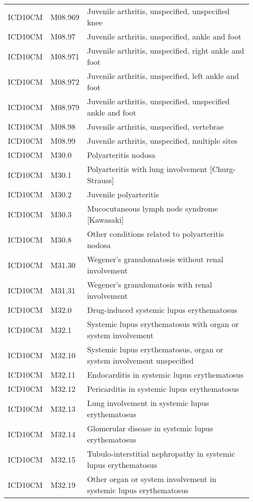 \begin{table}[ht]
\begin{tabular}{lll}
  ICD10CM & M08.969 & Juvenile arthritis, unspecified, unspecified knee \\ 
  ICD10CM & M08.97 & Juvenile arthritis, unspecified, ankle and foot \\ 
  ICD10CM & M08.971 & Juvenile arthritis, unspecified, right ankle and foot \\ 
  ICD10CM & M08.972 & Juvenile arthritis, unspecified, left ankle and foot \\ 
  ICD10CM & M08.979 & Juvenile arthritis, unspecified, unspecified ankle and foot \\ 
  ICD10CM & M08.98 & Juvenile arthritis, unspecified, vertebrae \\ 
  ICD10CM & M08.99 & Juvenile arthritis, unspecified, multiple sites \\ 
  ICD10CM & M30.0 & Polyarteritis nodosa \\ 
  ICD10CM & M30.1 & Polyarteritis with lung involvement [Churg-Strauss] \\ 
  ICD10CM & M30.2 & Juvenile polyarteritis \\ 
  ICD10CM & M30.3 & Mucocutaneous lymph node syndrome [Kawasaki] \\ 
  ICD10CM & M30.8 & Other conditions related to polyarteritis nodosa \\ 
  ICD10CM & M31.30 & Wegener's granulomatosis without renal involvement \\ 
  ICD10CM & M31.31 & Wegener's granulomatosis with renal involvement \\ 
  ICD10CM & M32.0 & Drug-induced systemic lupus erythematosus \\ 
  ICD10CM & M32.1 & Systemic lupus erythematosus with organ or system involvement \\ 
  ICD10CM & M32.10 & Systemic lupus erythematosus, organ or system involvement unspecified \\ 
  ICD10CM & M32.11 & Endocarditis in systemic lupus erythematosus \\ 
  ICD10CM & M32.12 & Pericarditis in systemic lupus erythematosus \\ 
  ICD10CM & M32.13 & Lung involvement in systemic lupus erythematosus \\ 
  ICD10CM & M32.14 & Glomerular disease in systemic lupus erythematosus \\ 
  ICD10CM & M32.15 & Tubulo-interstitial nephropathy in systemic lupus erythematosus \\ 
  ICD10CM & M32.19 & Other organ or system involvement in systemic lupus erythematosus \\ 

\end{tabular}
\end{table}
